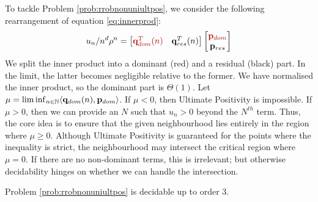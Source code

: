 To tackle Problem \ref{prob:rrobnonuniultpos}, we consider the following rearrangement of equation \ref{eq:innerprod}:
\begin{equation}
\label{eq:grouping}
u_n/n^d\rho^n = \begin{bmatrix}
{\color{red!70!black} \mathbf{q}_{dom}^T(n) } & \mathbf{q}_{res}^T(n)
\end{bmatrix}
\begin{bmatrix}
{\color{red!70!black} \mathbf{p}_{dom}} \\
\mathbf{p}_{res}
\end{bmatrix}
\end{equation}
We split the inner product into a dominant ({\color{red!70!black}red}) and a residual (black) part. In the limit, the latter becomes negligible relative to the former. We have normalised the inner product, so the dominant part is $\Theta(1)$. Let $\mu = \liminf_{n\in \mathbb{N}}\langle \mathbf{q}_{dom}(n), \mathbf{p}_{dom}\rangle$. If $\mu < 0$, then Ultimate Positivity is impossible. If $\mu > 0$, then we can provide an $N$ such that $u_n > 0$ beyond the $N^{th}$ term. Thus, the core idea is to ensure that the given neighbourhood lies entirely in the region where $\mu \ge 0$. Although Ultimate Positivity is guaranteed for the points where the inequality is strict, the neighbourhood may intersect the critical region where $\mu = 0$. If there are no non-dominant terms, this is irrelevant; but otherwise decidability hinges on whether we can handle the intersection.
\begin{theorem}
\label{thm:decide2}
Problem \ref{prob:rrobnonuniultpos} is decidable up to order 3.
\end{theorem}


